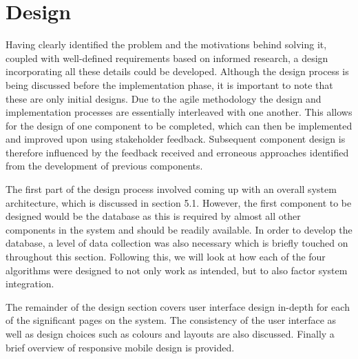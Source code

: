 \chapter{Design}
\label{Chapter:Design}
Having clearly identified the problem and the motivations behind solving it, coupled with well-defined requirements based on informed research, a design incorporating all these details could be developed. Although the design process is being discussed before the implementation phase, it is important to note that these are only initial designs. Due to the agile methodology the design and implementation processes are essentially interleaved with one another. This allows for the design of one component to be completed, which can then be implemented and improved upon using stakeholder feedback. Subsequent component design is therefore influenced by the feedback received and erroneous approaches identified from the development of previous components.

The first part of the design process involved coming up with an overall system architecture, which is discussed in section 5.1. However, the first component to be designed would be the database as this is required by almost all other components in the system and should be readily available. In order to develop the database, a level of data collection was also necessary which is briefly touched on throughout this section. Following this, we will look at how each of the four algorithms were designed to not only work as intended, but to also factor system integration.

The remainder of the design section covers user interface design in-depth for each of the significant pages on the system. The consistency of the user interface as well as design choices such as colours and layouts are also discussed. Finally a brief overview of responsive mobile design is provided.








